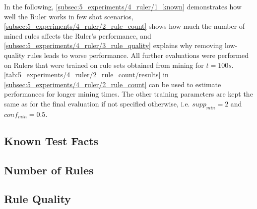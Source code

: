 In the following, \autoref{subsec:5_experiments/4_ruler/1_known} demonstrates how well the Ruler works in few shot scenarios, \autoref{subsec:5_experiments/4_ruler/2_rule_count} shows how much the number of mined rules affects the Ruler's performance, and \autoref{subsec:5_experiments/4_ruler/3_rule_quality} explains why removing low-quality rules leads to worse performance. All further evaluations were performed on Rulers that were trained on rule sets obtained from mining for $t = 100s$. \autoref{tab:5_experiments/4_ruler/2_rule_count/results} in \autoref{subsec:5_experiments/4_ruler/2_rule_count} can be used to estimate performances for longer mining times. The other training parameters are kept the same as for the final evaluation if not specified otherwise, i.e. $supp_{min} = 2$ and $conf_{min} = 0.5$.

\subsection{Known Test Facts}
\label{subsec:5_experiments/4_ruler/1_known}


\subsection{Number of Rules}
\label{subsec:5_experiments/4_ruler/2_rule_count}


\subsection{Rule Quality}
\label{subsec:5_experiments/4_ruler/3_rule_quality}

